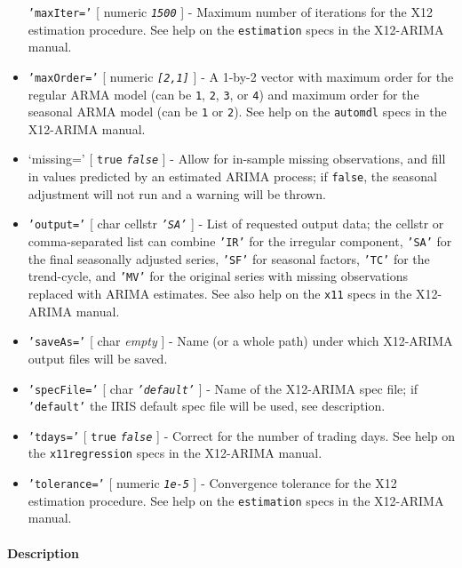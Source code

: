\begin{itemize}
   \texttt{'maxIter='} {[} numeric \textbar{} \emph{\texttt{1500}} {]} -
   Maximum number of iterations for the X12 estimation procedure. See
   help on the \texttt{estimation} specs in the X12-ARIMA manual.
 \item
   \texttt{'maxOrder='} {[} numeric \textbar{} \emph{\texttt{{[}2,1{]}}}
   {]} - A 1-by-2 vector with maximum order for the regular ARMA model
   (can be \texttt{1}, \texttt{2}, \texttt{3}, or \texttt{4}) and maximum
   order for the seasonal ARMA model (can be \texttt{1} or \texttt{2}).
   See help on the \texttt{automdl} specs in the X12-ARIMA manual.
 \item
   `missing=' {[} \texttt{true} \textbar{} \emph{\texttt{false}} {]} -
   Allow for in-sample missing observations, and fill in values predicted
   by an estimated ARIMA process; if \texttt{false}, the seasonal
   adjustment will not run and a warning will be thrown.
 \item
   \texttt{'output='} {[} char \textbar{} cellstr \textbar{}
   \emph{\texttt{'SA'}} {]} - List of requested output data; the cellstr
   or comma-separated list can combine \texttt{'IR'} for the irregular
   component, \texttt{'SA'} for the final seasonally adjusted series,
   \texttt{'SF'} for seasonal factors, \texttt{'TC'} for the trend-cycle,
   and \texttt{'MV'} for the original series with missing observations
   replaced with ARIMA estimates. See also help on the \texttt{x11} specs
   in the X12-ARIMA manual.
 \item
   \texttt{'saveAs='} {[} char \textbar{} \emph{empty} {]} - Name (or a
   whole path) under which X12-ARIMA output files will be saved.
 \item
   \texttt{'specFile='} {[} char \textbar{} \emph{\texttt{'default'}} {]}
   - Name of the X12-ARIMA spec file; if \texttt{'default'} the IRIS
   default spec file will be used, see description.
 \item
   \texttt{'tdays='} {[} \texttt{true} \textbar{} \emph{\texttt{false}}
   {]} - Correct for the number of trading days. See help on the
   \texttt{x11regression} specs in the X12-ARIMA manual.
 \item
   \texttt{'tolerance='} {[} numeric \textbar{} \emph{\texttt{1e-5}} {]}
   - Convergence tolerance for the X12 estimation procedure. See help on
   the \texttt{estimation} specs in the X12-ARIMA manual.
 \end{itemize}
 
 \paragraph{Description}
 
